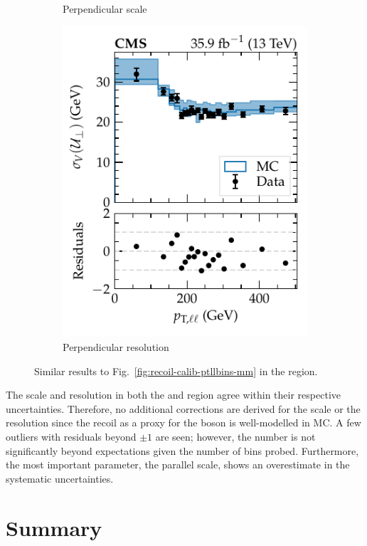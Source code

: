 \begin{figure}[htb]
\begin{subfigure}[b]{0.49\textwidth}
        \caption{Perpendicular scale}
        \label{subfigc:recoil-calib-ptllbins-ee}
    \end{subfigure}
    \hfill
    \begin{subfigure}[b]{0.49\textwidth}
        \centering
        \includegraphics{chapters/041_corrections/images/ptmiss_calib/metres_ee_sigmav_perp.pdf}
        \caption{Perpendicular resolution}
        \label{subfigd:recoil-calib-ptllbins-ee}
    \end{subfigure}
    \caption[Recoil scale and resolution in the dielectron final state.]{
        Similar results to Fig.~\ref{fig:recoil-calib-ptllbins-mm} in the \dieleplusjets region.
    }
    \label{fig:recoil-calib-ptllbins-ee}
\end{figure}
%
The scale and resolution in both the \dimuplusjets and \dieleplusjets region agree within their respective uncertainties. Therefore, no additional corrections are derived for the scale or the resolution since the recoil as a proxy for the boson \pt is well-modelled in MC. A few outliers with residuals beyond $\pm 1$ are seen; however, the number is not significantly beyond expectations given the number of bins probed. Furthermore, the most important parameter, the parallel scale, shows an overestimate in the systematic uncertainties.

\clearpage
\section{Summary}

